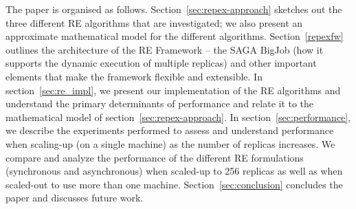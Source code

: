 \documentclass{rspublic}
\newcommand{\jhanote}[1]{ {\textcolor{red} { ***shantenu: #1 }}}
\newcommand{\alnote}[1]{ {\textcolor{blue} { ***andre: #1 }}}
\newcommand{\athotanote}[1]{ {\textcolor{green} { ***athota: #1 }}}
\newcommand{\alnote}[1]{}
\newcommand{\athotanote}[1]{}
\newcommand{\jhanote}[1]{}
\begin{document}




The paper is organised as follows. Section~\ref{sec:repex-approach}
sketches out the three different RE algorithms that are investigated;
we also present an approximate mathematical model for the different
algorithms.  Section~\ref{repexfw} outlines the architecture of the RE
Framework -- the SAGA BigJob (how it supports the dynamic execution of
multiple replicas) and other important elements that make the
framework flexible and extensible.  In section~\ref{sec:re_impl}, we
present our implementation of the RE algorithms and understand the
primary determinants of performance and relate it to the mathematical
model of section~\ref{sec:repex-approach}.  In section~\ref{sec:performance}, we
describe the experiments performed to assess and understand
performance when scaling-up (on a single machine) as the number of
replicas increases.  We compare and analyze the performance of the
different RE formulations (synchronous and asynchronous) when
scaled-up to 256 replicas as well as when scaled-out to use more than
one machine. Section~\ref{sec:conclusion} concludes the paper and
discusses future work.
\end{document}
